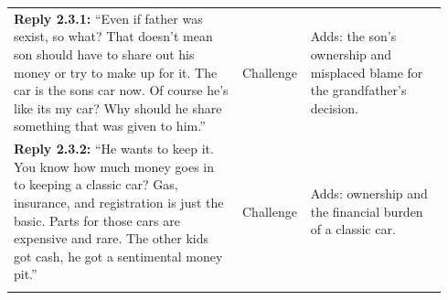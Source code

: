 \begin{table}[H]
\begin{tabular}{@{}p{0.52\linewidth}p{0.11\linewidth}p{0.31\linewidth}@{}}
\textbf{Reply 2.3.1:} ``Even if father was sexist, so what? That doesn't mean son should have to share out his money or try to make up for it. The car is the sons car now. Of course he's like its my car? Why should he share something that was given to him.'' & Challenge & Adds: the son's ownership and misplaced blame for the grandfather's decision. \\
\addlinespace[3pt]
\textbf{Reply 2.3.2:} ``He wants to keep it.  You know how much money goes in to keeping a classic car?  Gas, insurance, and registration is just the basic. Parts for those cars are expensive and rare.  The other kids got cash, he got a sentimental money pit.'' & Challenge & Adds: ownership and the financial burden of a classic car. \\
\addlinespace[3pt]
\bottomrule
\end{tabular}
\end{table}

